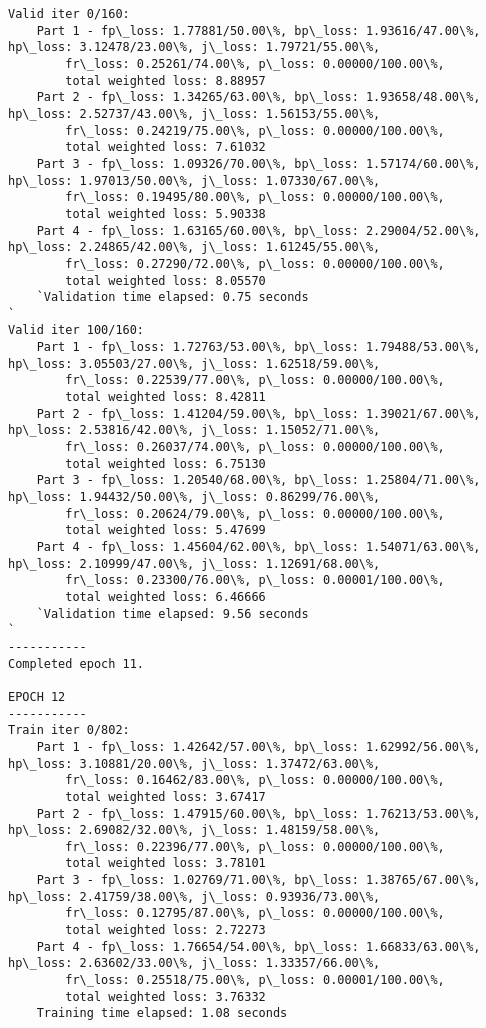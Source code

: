 \documentclass[11pt]{article}
\begin{document}
\begin{Verbatim}[commandchars=\\\{\}]
Valid iter 0/160:
	Part 1 - fp\_loss: 1.77881/50.00\%, bp\_loss: 1.93616/47.00\%, hp\_loss: 3.12478/23.00\%, j\_loss: 1.79721/55.00\%, 
		fr\_loss: 0.25261/74.00\%, p\_loss: 0.00000/100.00\%, 
		total weighted loss: 8.88957
	Part 2 - fp\_loss: 1.34265/63.00\%, bp\_loss: 1.93658/48.00\%, hp\_loss: 2.52737/43.00\%, j\_loss: 1.56153/55.00\%, 
		fr\_loss: 0.24219/75.00\%, p\_loss: 0.00000/100.00\%, 
		total weighted loss: 7.61032
	Part 3 - fp\_loss: 1.09326/70.00\%, bp\_loss: 1.57174/60.00\%, hp\_loss: 1.97013/50.00\%, j\_loss: 1.07330/67.00\%, 
		fr\_loss: 0.19495/80.00\%, p\_loss: 0.00000/100.00\%, 
		total weighted loss: 5.90338
	Part 4 - fp\_loss: 1.63165/60.00\%, bp\_loss: 2.29004/52.00\%, hp\_loss: 2.24865/42.00\%, j\_loss: 1.61245/55.00\%, 
		fr\_loss: 0.27290/72.00\%, p\_loss: 0.00000/100.00\%, 
		total weighted loss: 8.05570
	`Validation time elapsed: 0.75 seconds
`
Valid iter 100/160:
	Part 1 - fp\_loss: 1.72763/53.00\%, bp\_loss: 1.79488/53.00\%, hp\_loss: 3.05503/27.00\%, j\_loss: 1.62518/59.00\%, 
		fr\_loss: 0.22539/77.00\%, p\_loss: 0.00000/100.00\%, 
		total weighted loss: 8.42811
	Part 2 - fp\_loss: 1.41204/59.00\%, bp\_loss: 1.39021/67.00\%, hp\_loss: 2.53816/42.00\%, j\_loss: 1.15052/71.00\%, 
		fr\_loss: 0.26037/74.00\%, p\_loss: 0.00000/100.00\%, 
		total weighted loss: 6.75130
	Part 3 - fp\_loss: 1.20540/68.00\%, bp\_loss: 1.25804/71.00\%, hp\_loss: 1.94432/50.00\%, j\_loss: 0.86299/76.00\%, 
		fr\_loss: 0.20624/79.00\%, p\_loss: 0.00000/100.00\%, 
		total weighted loss: 5.47699
	Part 4 - fp\_loss: 1.45604/62.00\%, bp\_loss: 1.54071/63.00\%, hp\_loss: 2.10999/47.00\%, j\_loss: 1.12691/68.00\%, 
		fr\_loss: 0.23300/76.00\%, p\_loss: 0.00001/100.00\%, 
		total weighted loss: 6.46666
	`Validation time elapsed: 9.56 seconds
`
-----------
Completed epoch 11.

EPOCH 12
-----------
Train iter 0/802:
	Part 1 - fp\_loss: 1.42642/57.00\%, bp\_loss: 1.62992/56.00\%, hp\_loss: 3.10881/20.00\%, j\_loss: 1.37472/63.00\%, 
		fr\_loss: 0.16462/83.00\%, p\_loss: 0.00000/100.00\%, 
		total weighted loss: 3.67417
	Part 2 - fp\_loss: 1.47915/60.00\%, bp\_loss: 1.76213/53.00\%, hp\_loss: 2.69082/32.00\%, j\_loss: 1.48159/58.00\%, 
		fr\_loss: 0.22396/77.00\%, p\_loss: 0.00000/100.00\%, 
		total weighted loss: 3.78101
	Part 3 - fp\_loss: 1.02769/71.00\%, bp\_loss: 1.38765/67.00\%, hp\_loss: 2.41759/38.00\%, j\_loss: 0.93936/73.00\%, 
		fr\_loss: 0.12795/87.00\%, p\_loss: 0.00000/100.00\%, 
		total weighted loss: 2.72273
	Part 4 - fp\_loss: 1.76654/54.00\%, bp\_loss: 1.66833/63.00\%, hp\_loss: 2.63602/33.00\%, j\_loss: 1.33357/66.00\%, 
		fr\_loss: 0.25518/75.00\%, p\_loss: 0.00001/100.00\%, 
		total weighted loss: 3.76332
	Training time elapsed: 1.08 seconds


\end{Verbatim}
\end{document}
